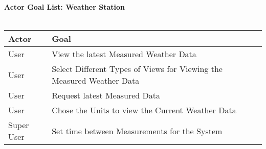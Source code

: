 \documentclass[letterpaper]{article}
\begin{document}
\noindent
\textbf{Actor Goal List:  Weather Station}\\\\
\vspace{4ex}
\begin{tabular}{|p{2cm}|p{5cm}|}\hline
\textbf{Actor} & \textbf{Goal}\\\hline
User & View the latest Measured Weather Data\\\hline
User & Select Different Types of Views for Viewing the Measured Weather
Data\\\hline
User & Request latest Measured Data\\\hline
User & Chose the Units to view the Current Weather Data\\\hline
Super User & Set time between Measurements for the 
System\\\hline
\end{tabular}
\end{document}
